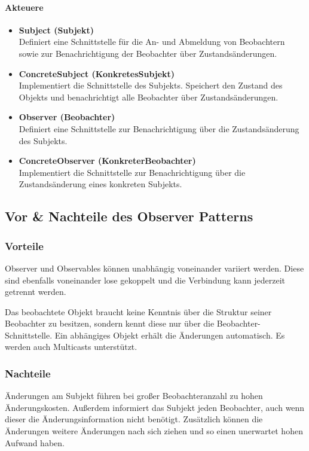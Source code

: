 	\paragraph{Akteuere \cite{new}}\mbox{}
	\vspace{0.1cm}
	\begin{itemize}
		\item \textbf{Subject (Subjekt)}\\
		Definiert eine Schnittstelle für die An- und Abmeldung von Beobachtern sowie zur Benachrichtigung der Beobachter über Zustandsänderungen.
		
		\item \textbf{ConcreteSubject (KonkretesSubjekt)}\\
		Implementiert die Schnittstelle des Subjekts. Speichert den Zustand des Objekts und benachrichtigt alle Beobachter über Zustandsänderungen.
		
		\item \textbf{Observer (Beobachter)}\\
		Definiert eine Schnittstelle zur Benachrichtigung über die Zustandsänderung des Subjekts.
		
		\item \textbf{ConcreteObserver (KonkreterBeobachter)}\\
		Implementiert die Schnittstelle zur Benachrichtigung über die Zustandsänderung eines konkreten Subjekts.
	\end{itemize}
	
	\subsection{Vor \& Nachteile des Observer Patterns}
		\subsubsection{Vorteile \cite{wikiobs}}
		Observer und Observables können unabhängig voneinander variiert werden. Diese sind ebenfalls voneinander lose gekoppelt und die Verbindung kann jederzeit getrennt werden.
		
		Das beobachtete Objekt braucht keine Kenntnis über die Struktur seiner Beobachter zu besitzen, sondern kennt diese nur über die Beobachter-Schnittstelle. Ein abhängiges Objekt erhält die Änderungen automatisch. Es werden auch Multicasts unterstützt.
		
		\subsubsection{Nachteile \cite{wikiobs}}
		Änderungen am Subjekt führen bei großer Beobachteranzahl zu hohen Änderungskosten. Außerdem informiert das Subjekt jeden Beobachter, auch wenn dieser die Änderungsinformation nicht benötigt. Zusätzlich können die Änderungen weitere Änderungen nach sich ziehen und so einen unerwartet hohen Aufwand haben.
		
